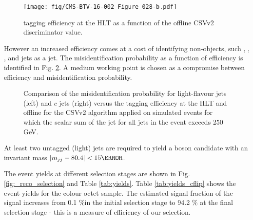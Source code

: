 \begin{figure}[hbtp]
\centering
\texttt{[image: fig/CMS-BTV-16-002\_Figure\_028-b.pdf]}
\caption{\cPqb tagging efficiency at the HLT as a function of the offline CSVv2 discriminator value. \cite{Sirunyan:2017ezt}}
\label{fig:CMS-BTV-16-002_Figure_028-b}
\end{figure}

However an increased efficiency comes at a cost of identifying non-\cPqb objects, such \cPqc, \cPqs, \cPqu, \cPqd and \Pg jets as a \cPqb jet. The misidentification probability as a function of efficiency is identified in Fig. \ref{fig:CMS-BTV-16-002_Figure_029}. A medium working point is chosen as a compromise between efficiency and misidentification probability.

\begin{figure}[hbtp]
\centering
  \def\twidth{0.45}
  \centering
  \hfil
\caption{Comparison of the misidentification probability for light-flavour jets (left) and $c$ jets (right) versus the \cPqb tagging efficiency at the HLT and offline for the CSVv2 algorithm applied on simulated \ttbar events for which the scalar sum of the jet \pt for all jets in the event exceeds 250 GeV. \cite{Sirunyan:2017ezt}}
\label{fig:CMS-BTV-16-002_Figure_029}
\end{figure}


At least two untagged (light) jets are required to yield a \PW boson candidate with an invariant mass $\left|m_{jj}-80.4\right|<15\GeV$.

The event yields at different selection stages are shown in Fig. \ref{fig:_reco_selection} and Table \ref{tab:yields}.  Table \ref{tab:yields_cflip} shows the event yields for the colour octet \PW sample. The estimated signal fraction of the signal increases from 0.1 \%in the initial selection stage to 94.2 \% at the final selection stage - this is a measure of efficiency of our selection.




